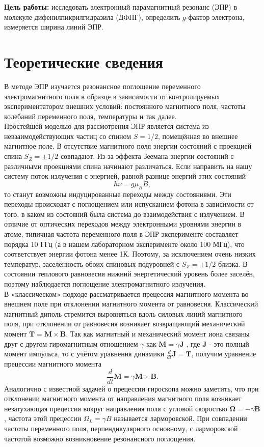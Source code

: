 \documentclass[a4paper,12pt]{article} %
\begin{document}
\noindent
\textbf{Цель работы:}  исследовать электронный парамагнитный резонанс (ЭПР) в молекуле дифенилпикрилгидразила (ДФПГ), определить $g$-фактор электрона, измеряется ширина линий ЭПР.

\medskip

\section{Теоретические сведения}

В методе ЭПР изучается резонансное поглощение переменного электромагнитного поля в образце в зависимости от контролируемых экспериментатором внешних условий: постоянного магнитного поля, частоты колебаний переменного поля, температуры и так далее. \\
Простейшей моделью для рассмотрения ЭПР является система из невзаимодействующих
частиц со спином $S = 1/2$, помещённая во внешнее магнитное поле. В отсутствие
магнитного поля энергии состояний с проекцией спина $S_Z = \pm 1/2$ совпадают. Из-за эффекта Зеемана энергии состояний с различными проекциями спина начинают различаться. Если направить на нашу систему поток излучения с энергией, равной разнице энергий этих состояний 
\begin{equation}\label{2}
h \nu = g\mu_B B,
\end{equation} 
то станут возможны индуцированные переходы между состояниями. Эти переходы происходят с поглощением или испусканием фотона в зависимости от того, в каком из состояний была система до взаимодействия с излучением. В отличие от оптических переходов между электронными уровнями энергии в атоме, типичная частота переменного поля в ЭПР эксперименте составляет порядка 10 ГГц (а в нашем лабораторном эксперименте около 100 МГц), что соответствует энергии фотона менее 1К. Поэтому, за исключением очень низких температур, заселённость обоих спиновых подуровней с $S_Z = \pm 1/2$ близка. В состоянии теплового равновесия нижний энергетический уровень более заселён, поэтому наблюдается поглощение электромагнитного излучения. \\
В «классическом» подходе рассматривается прецессия магнитного момента во внешнем поле при отклонении магнитного момента от равновесия. Классический магнитный диполь стремится выровняться вдоль силовых линий магнитного поля, при отклонении от равновесия возникает возвращающий механический момент $\mathbf{T} = \mathbf{M}\times \mathbf{B}$. Так как магнитный и механический момент иона связаны друг с другом гиромагнитным отношением $\gamma$ как $\mathbf{M}=\gamma \mathbf{J}$ , где $\mathbf{J}$ - это полный момент импульса, то с учётом уравнения динамики
$\frac{d}{dt}\mathbf{J} = \mathbf{T}$, получим уравнение прецессии магнитного момента
\[\dfrac{d}{dt}\mathbf{M} = \gamma \mathbf{M} \times \mathbf{B}.\] 
Аналогично
с известной задачей о прецессии гироскопа можно заметить, что при отклонении магнитного момента от направления магнитного поля возникает незатухающая прецессия вокруг направления поля с угловой скоростью $\boldsymbol{\Omega} = -\gamma \mathbf{B}$, частота этой прецессии $\Omega_L = \gamma B$ называется ларморовской. При совпадении частоты переменного поля, перпендикулярного основному, с ларморовской частотой возможно возникновение резонансного поглощения.
\end{document}
